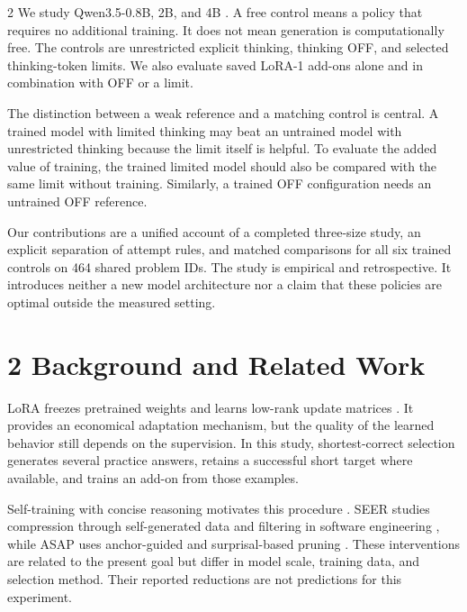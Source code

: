 \documentclass[11pt,letterpaper]{article}
\begin{document}
\begin{multicols}{2}
We study Qwen3.5-0.8B, 2B, and 4B \cite{q08,q2,q4}. A free control means a policy that requires no additional training. It does not mean generation is computationally free. The controls are unrestricted explicit thinking, thinking OFF, and selected thinking-token limits. We also evaluate saved LoRA-1 add-ons alone and in combination with OFF or a limit.\par

The distinction between a weak reference and a matching control is central. A trained model with limited thinking may beat an untrained model with unrestricted thinking because the limit itself is helpful. To evaluate the added value of training, the trained limited model should also be compared with the same limit without training. Similarly, a trained OFF configuration needs an untrained OFF reference.\par

Our contributions are a unified account of a completed three-size study, an explicit separation of attempt rules, and matched comparisons for all six trained controls on 464 shared problem IDs. The study is empirical and retrospective. It introduces neither a new model architecture nor a claim that these policies are optimal outside the measured setting.\par

\section*{2 Background and Related Work}

LoRA freezes pretrained weights and learns low-rank update matrices \cite{lora}. It provides an economical adaptation mechanism, but the quality of the learned behavior still depends on the supervision. In this study, shortest-correct selection generates several practice answers, retains a successful short target where available, and trains an add-on from those examples.\par

Self-training with concise reasoning motivates this procedure \cite{selftrain}. SEER studies compression through self-generated data and filtering in software engineering \cite{seer}, while ASAP uses anchor-guided and surprisal-based pruning \cite{asap}. These interventions are related to the present goal but differ in model scale, training data, and selection method. Their reported reductions are not predictions for this experiment.\par


\end{multicols}
\end{document}
